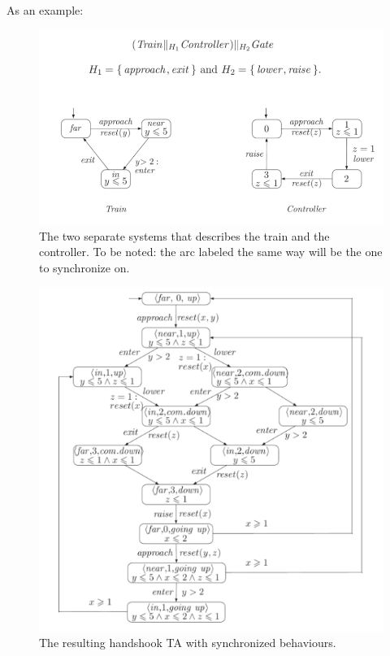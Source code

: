 \documentclass{article}
\begin{document}
				As an example:
				\begin{figure}[H]
					\centering
					\includegraphics[width = \textwidth]{./images/TAex1.png}
					\caption{The two separate systems that describes the train and the controller. To be noted: the arc labeled the same way will be the one to synchronize on.}
				\end{figure}
				\begin{figure}[H]
					\centering
					\includegraphics[width = \textwidth]{./images/TAex2.png}
					\caption{The resulting handshook TA with synchronized behaviours.}
				\end{figure}
				
\end{document}
